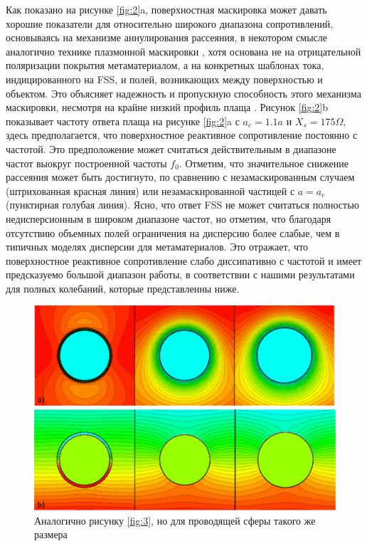 \documentclass[12pt,a4paper]{article}
\begin{document}
Как показано на рисунке \ref{fig:2}a, поверхностная маскировка может давать хорошие 
показатели для относительно широкого диапазона сопротивлений, основываясь на механизме
аннулирования рассеяния, в некотором смысле аналогично технике плазмонной маскировки 
\cite{8}, хотя основана не на отрицательной поляризации покрытия метаматериалом, а на
конкретных шаблонах тока, индицированного на FSS, и полей, возникающих между поверхностью и
объектом. Это объясняет надежность и пропускную способность этого механизма маскировки,
несмотря на крайне низкий профиль плаща \cite{13}. Рисунок \ref{fig:2}b показывает
частоту ответа плаща на рисунке \ref{fig:2}a с $a_c=1.1a$ и $X_s = 175\Omega$, здесь 
предполагается, что поверхностное реактивное сопротивление постоянно с частотой. Это 
предположение может считаться действительным в диапазоне частот выокруг построенной
частоты $f_0$. Отметим, что значительное снижение рассеяния может быть достигнуто, по 
сравнению с незамаскированным случаем (штрихованная красная линия) или незамаскированной
частицей с $a=a_c$ (пунктирная голубая линия). Ясно, что ответ FSS не может считаться 
полностью недисперсионным в широком диапазоне частот, но отметим, что благодаря отсутствию
объемных полей ограничения на дисперсию более слабые, чем в типичных моделях дисперсии для 
метаматериалов. Это отражает, что поверхностное реактивное сопротивление слабо диссипативно
с частотой и имеет предсказуемо большой диапазон работы, в соответствии с нашими результатами
для полных колебаний, которые представленны ниже.

\begin{figure}[t]
  \centering
  \includegraphics[height=0.15\paperheight, width=0.4\paperwidth]{5.png}
  \caption{Аналогично рисунку \ref{fig:3}, но для проводящей сферы такого же размера}
  \label{fig:5}
\end{figure}
\end{document}
